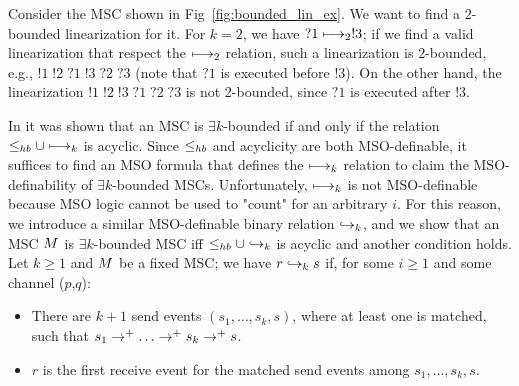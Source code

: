 \begin{example}
  Consider the MSC shown in Fig~\ref{fig:bounded_lin_ex}. We want to find a $2$-bounded linearization for it. For $k=2$, we have $?1 \longmapsto_{2} !3$; if we find a valid linearization that respect the $\longmapsto_{2}$ relation, such a linearization is $2$-bounded, e.g., $!1\;!2\;?1\;!3\;?2\;?3$ (note that $?1$ is executed before $!3$). On the other hand, the linearization $!1\;!2\;!3\;?1\;?2\;?3$ is not 2-bounded, since $?1$ is executed after $!3$.
\end{example}  


In \cite{DBLP:conf/fossacs/LohreyM02} it was shown that an MSC is $\exists k$-bounded if and only if the relation $\leq_{hb} \cup \longmapsto_k$ is acyclic. Since $\leq_{hb}$ and acyclicity are both MSO-definable, it suffices to find an MSO formula that defines the $\longmapsto_k$ relation to claim the MSO-definability of $\exists k$-bounded MSCs. Unfortunately, $\longmapsto_k$ is not MSO-definable because MSO logic cannot be used to "count" for an arbitrary $i$. For this reason, we introduce a similar MSO-definable binary relation $\hookrightarrow_{k}$, and we show that an MSC $M$ is $\exists k$-bounded MSC iff $\leq_{hb} \cup \hookrightarrow_{k}$ is acyclic and another condition holds. Let $k \ge 1$ and $M$ be a fixed MSC; we have $r \hookrightarrow_{k} s$ if, for some $i \ge 1$ and some channel ($p$,$q$):
\begin{itemize}\itemsep=0.5ex
	\item There are $k+1$ send events $(s_1, \dots, s_k, s)$, where at least one is matched, such that $s_1 \procrel^+ \dots \procrel^+ s_k \procrel^+ s$.
 	\item $r$ is the first receive event for the matched send events among $s_1, \dots, s_k, s$.
\end{itemize}

